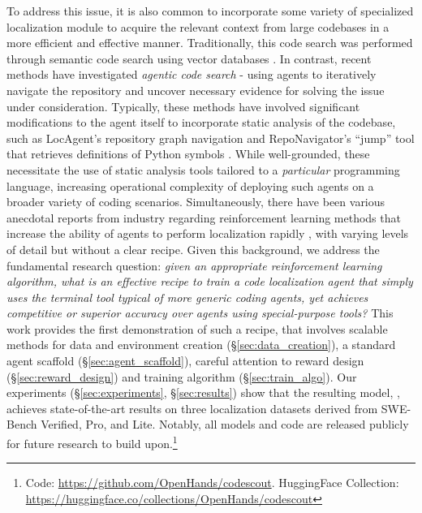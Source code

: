 To address this issue, it is also common to incorporate some variety of specialized localization module to acquire the relevant context from large codebases in a more efficient and effective manner.
Traditionally, this code search was performed through semantic code search using vector databases \citep{xia2024agentless,wang2025coderag}. In contrast, recent methods have investigated \emph{agentic code search} - using agents to iteratively navigate the repository and uncover necessary evidence for solving the issue under consideration.
Typically, these methods have involved significant modifications to the agent itself to incorporate static analysis of the codebase, such as LocAgent's repository graph navigation \citep{chen-etal-2025-locagent} and RepoNavigator's ``jump'' tool that retrieves definitions of Python symbols \citep{zhang2025one}.
While well-grounded, these necessitate the use of static analysis tools tailored to a \emph{particular} programming language, increasing operational complexity of deploying such agents on a broader variety of coding scenarios.
Simultaneously, there have been various anecdotal reports from industry regarding reinforcement learning methods that increase the ability of agents to perform localization rapidly \citep{cognition2025swegrep,cursor2025composer}, with varying levels of detail but without a clear recipe.
% 
Given this background, we address the fundamental research question: \emph{given an appropriate reinforcement learning algorithm, what is an effective recipe to train a code localization agent that simply uses the terminal tool typical of more generic coding agents, yet achieves competitive or superior accuracy over agents using special-purpose tools?}
This work provides the first demonstration of such a recipe, that involves scalable methods for data and environment creation (\S\ref{sec:data_creation}), a standard agent scaffold (\S\ref{sec:agent_scaffold}), careful attention to reward design (\S\ref{sec:reward_design}) and training algorithm (\S\ref{sec:train_algo}).
Our experiments (\S\ref{sec:experiments}, \S\ref{sec:results}) show that the resulting model, \methodname, achieves state-of-the-art results on three localization datasets derived from SWE-Bench Verified, Pro, and Lite. Notably, all models and code are released publicly for future research to build upon.\footnote{Code: \url{https://github.com/OpenHands/codescout}.  HuggingFace Collection: \url{https://huggingface.co/collections/OpenHands/codescout}}

